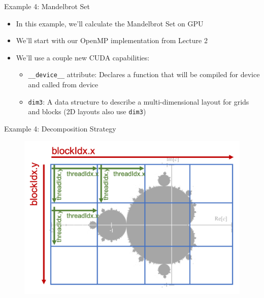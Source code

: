 \documentclass{beamer}
\begin{document}
    \begin{frame}{Example 4:  Mandelbrot Set}
        \begin{itemize}
            \item In this example, we'll calculate the Mandelbrot Set on GPU
            \item We'll start with our OpenMP implementation from Lecture 2
            \item We'll use a couple new CUDA capabilities:
            \begin{itemize}
                \item \texttt{\_\_device\_\_} attribute:  Declares a function
                      that will be compiled for device and called from device
                \item \texttt{dim3}: A data structure to describe a multi-dimensional layout for grids and blocks (2D layouts also use \texttt{dim3})
            \end{itemize}
        \end{itemize}
    \end{frame}

    \begin{frame}{Example 4: Decomposition Strategy}
        \begin{figure}
            \centering
            \includegraphics[width=\textwidth]{img/03/mandelbrot.png}
        \end{figure}

    \end{frame}
\end{document}
